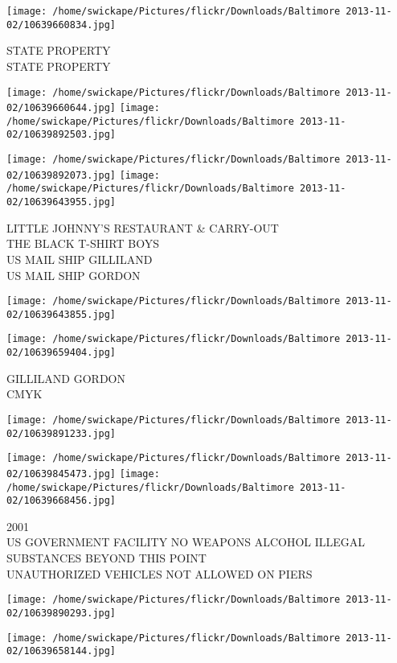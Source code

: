 \documentclass[10pt,letterpaper]{article}
\begin{document}
\vspace{0.25in}
\texttt{[image: /home/swickape/Pictures/flickr/Downloads/Baltimore 2013-11-02/10639660834.jpg]}

STATE PROPERTY\\
STATE PROPERTY
\pagebreak

\texttt{[image: /home/swickape/Pictures/flickr/Downloads/Baltimore 2013-11-02/10639660644.jpg]}
\texttt{[image: /home/swickape/Pictures/flickr/Downloads/Baltimore 2013-11-02/10639892503.jpg]}

\texttt{[image: /home/swickape/Pictures/flickr/Downloads/Baltimore 2013-11-02/10639892073.jpg]}
\texttt{[image: /home/swickape/Pictures/flickr/Downloads/Baltimore 2013-11-02/10639643955.jpg]}

LITTLE JOHNNY'S RESTAURANT \& CARRY{-}OUT\\
THE BLACK T{-}SHIRT BOYS\\
US MAIL SHIP GILLILAND\\
US MAIL SHIP GORDON
\pagebreak

\texttt{[image: /home/swickape/Pictures/flickr/Downloads/Baltimore 2013-11-02/10639643855.jpg]}

\vspace{0.25in}
\texttt{[image: /home/swickape/Pictures/flickr/Downloads/Baltimore 2013-11-02/10639659404.jpg]}

GILLILAND GORDON\\
CMYK
\pagebreak

\texttt{[image: /home/swickape/Pictures/flickr/Downloads/Baltimore 2013-11-02/10639891233.jpg]}

\vspace{0.25in}
\texttt{[image: /home/swickape/Pictures/flickr/Downloads/Baltimore 2013-11-02/10639845473.jpg]}
\texttt{[image: /home/swickape/Pictures/flickr/Downloads/Baltimore 2013-11-02/10639668456.jpg]}

2001\\
US GOVERNMENT FACILITY NO WEAPONS ALCOHOL ILLEGAL SUBSTANCES BEYOND THIS POINT\\
UNAUTHORIZED VEHICLES NOT ALLOWED ON PIERS
\pagebreak

\texttt{[image: /home/swickape/Pictures/flickr/Downloads/Baltimore 2013-11-02/10639890293.jpg]}

\vspace{0.25in}
\texttt{[image: /home/swickape/Pictures/flickr/Downloads/Baltimore 2013-11-02/10639658144.jpg]}
\end{document}
